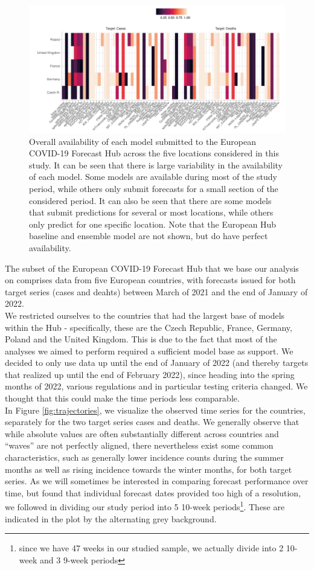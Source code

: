\begin{figure}
\includegraphics[width = \textwidth]{../plots/availability_indiv.pdf}
\caption{Overall availability of each model submitted to the European COVID-19 Forecast Hub across the five locations considered in this study. It can be seen that there is large variability in the availability of each model. Some models are available during most of the study period, while others only submit forecasts for a small section of the considered period. It can also be seen that there are some models that submit predictions for several or most locations, while others only predict for one specific location. Note that the European Hub baseline and ensemble model are not shown, but do have perfect availability.}
\label{fig:avail_indiv}
\end{figure}
The subset of the European COVID-19 Forecast Hub that we base our analysis on comprises data from five European countries, with forecasts issued for both target series (cases and deahts) between March of 2021 and the end of January of 2022. \\
We restricted ourselves to the countries that had the largest base of models within the Hub - specifically, these are the Czech Republic, France, Germany, Poland and the United Kingdom. This is due to the fact that most of the analyses we aimed to perform required a sufficient model base as support. We decided to only use data up until the end of January of 2022 (and thereby targets that realized up until the end of February 2022), since heading into the spring months of 2022, various regulations and in particular testing criteria changed. We thought that this could make the time periods less comparable.\\
In Figure \ref{fig:trajectories}, we visualize the observed time series for the countries, separately for the two target series cases and deaths. We generally observe that while absolute values are often substantially different across countries and ``waves'' are not perfectly aligned, there nevertheless exist some common characteristics, such as generally lower incidence counts during the summer months as well as rising incidence towards the winter months, for both target series. As we will sometimes be interested in comparing forecast performance over time, but found that individual forecast dates provided too high of a resolution, we followed \cite{taylor_combining_2021} in dividing our study period into 5 10-week periods\footnote{since we have 47 weeks in our studied sample, we actually divide into 2 10-week and 3 9-week periods}. These are indicated in the plot by the alternating grey background.\\
